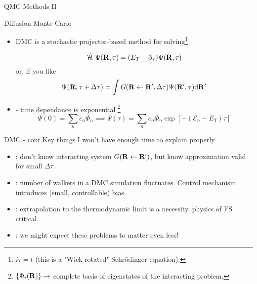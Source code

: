 \documentclass[12pt, pdf, hyperref={draft}, usenames, dvipsnames]{beamer}
\newcommand{\dd}{\mathrm{d}}
\newcommand{\red}[1]{{\bf\color{LancsRed}{#1}}}
\newcommand{\blue}[1]{{\bf\color{NavyBlue}{#1}}}
\newcommand{\green}[1]{{\bf\color{ForestGreen}{#1}}}
\begin{document}
\begin{frame}{QMC Methods II}
  \begin{block}{Diffusion Monte Carlo}
    \begin{itemize}
      \item DMC is a stochastic projector-based method for solving\footnote{$
      i\tau = t$ (this is a "Wick rotated" Schr\"odinger equation).}

      \begin{equation}
      \mathcal{\hat H}\ \Psi({\bf R}, \tau)
      = (E_T-\partial_{\tau})\Psi({\bf R}, \tau)
      \end{equation}
      or, if you like
      \begin{equation}
      \Psi({\bf R}, \tau+\Delta \tau)
      = \displaystyle\int G({\bf R} \leftarrow {\bf R'},\Delta \tau)
      \Psi({\bf R'}, \tau) \dd{\bf R'}
      \end{equation}

      \item \green{Separable} - time dependance is exponential
      \footnote{$\{\Phi_i({\bf R})\} \rightarrow$ complete basis of eigenstates of the
      interacting problem.}
      \begin{equation}
      \Psi(0) = \sum_n c_n \Phi_n \implies
      \Psi(\tau) = \sum_n c_n \Phi_n\exp{\left[-(\mathcal{E}_n -
      E_T)\tau\right]}
      \end{equation}
    \end{itemize}
  \end{block}
\end{frame}

\begin{frame}{DMC - cont.}{Key things I won't have enough time to
                           explain properly}
  \begin{itemize}
    \item \blue{Time steps}: don't know interacting system $G({\bf R}
    \leftarrow {\bf R'})$, but know approximation valid for small $\Delta
    \tau$.

    \item \blue{Population control}: number of walkers in a DMC simulation
    fluctuates. Control mechanism introduces (small, controllable) bias.

    \item \red{Finite Size effects}: extrapolation to the thermodynamic limit
    is a necessity, physics of FS critical.
    \item \green{Gaps}: we might expect these problems to matter even less!
  \end{itemize}
\end{frame}
\end{document}
